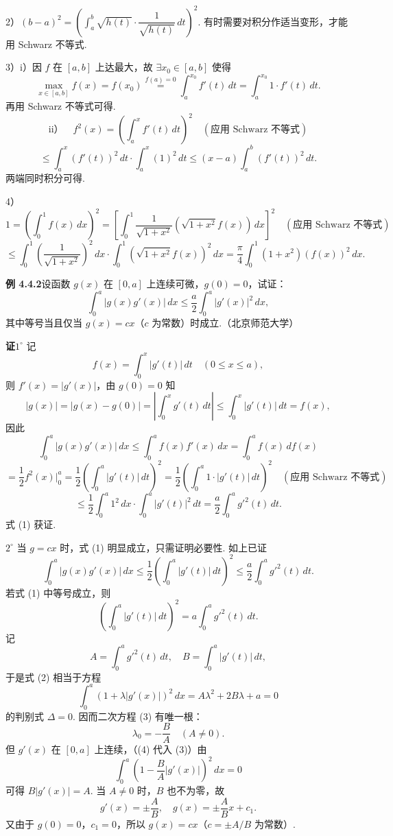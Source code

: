 \documentclass[UTF8,12pt,a4paper,fontset=fandol]{ctexart}
\begin{document}
2）$(b-a)^2=\left(\displaystyle\int_a^b \sqrt{h(t)}\cdot\dfrac1{\sqrt{h(t)}}\,dt\right)^2$. 有时需要对积分作适当变形，才能用 Schwarz 不等式.

3）i）因 $f$ 在 $[a,b]$ 上达最大，故 $\exists x_0\in[a,b]$ 使得
\[
\max_{x\in[a,b]}f(x)=f(x_0)\stackrel{f(a)=0}{=}\int_a^{x_0}f'(t)\,dt=\int_a^{x_0}1\cdot f'(t)\,dt.
\]
再用 Schwarz 不等式可得.
\[
\text{ii）}\quad f^2(x)=\left(\int_a^x f'(t)\,dt\right)^2\quad(\text{应用 Schwarz 不等式})
\]
\[
\le \int_a^x(f'(t))^2\,dt\cdot\int_a^x(1)^2\,dt
\le (x-a)\int_a^b(f'(t))^2\,dt.
\]
两端同时积分可得.

4）
\[
1=\left(\int_0^1 f(x)\,dx\right)^2
=\left[\int_0^1\frac1{\sqrt{1+x^2}}(\sqrt{1+x^2}f(x))\,dx\right]^2\quad(\text{应用 Schwarz 不等式})
\]
\[
\le \int_0^1\left(\frac1{\sqrt{1+x^2}}\right)^2\,dx\cdot
\int_0^1(\sqrt{1+x^2}f(x))^2\,dx
=\frac\pi4\int_0^1(1+x^2)(f(x))^2\,dx.
\]

\noindent\textbf{例 4.4.2}\quad 设函数 $g(x)$ 在 $[0,a]$ 上连续可微，$g(0)=0$，试证：
\[
\int_0^a |g(x)g'(x)|\,dx\le\frac a2\int_0^a |g'(x)|^2\,dx, \tag{1}
\]
其中等号当且仅当 $g(x)=cx$（$c$ 为常数）时成立.（北京师范大学）

\noindent\textbf{证}\quad $1^\circ$ 记
\[
f(x)=\int_0^x |g'(t)|\,dt\quad(0\le x\le a),
\]
则 $f'(x)=|g'(x)|$，由 $g(0)=0$ 知
\[
|g(x)|=|g(x)-g(0)|=\left|\int_0^x g'(t)\,dt\right|
\le \int_0^x |g'(t)|\,dt=f(x),
\]
因此
\[
\int_0^a |g(x)g'(x)|\,dx
\le \int_0^a f(x)f'(x)\,dx
=\int_0^a f(x)\,df(x)
\]
\[
=\frac12 f^2(x)\bigg|_0^a
=\frac12\left(\int_0^a |g'(t)|\,dt\right)^2
=\frac12\left(\int_0^a 1\cdot |g'(t)|\,dt\right)^2
\quad(\text{应用 Schwarz 不等式})
\]
\[
\le \frac12\int_0^a 1^2\,dx\cdot\int_0^a |g'(t)|^2\,dt
=\frac a2\int_0^a g'^2(t)\,dt.
\]
式 (1) 获证.

$2^\circ$ 当 $g=cx$ 时，式 (1) 明显成立，只需证明必要性. 如上已证
\[
\int_0^a |g(x)g'(x)|\,dx
\le \frac12\left(\int_0^a |g'(t)|\,dt\right)^2
\le \frac a2\int_0^a g'^2(t)\,dt.
\]
若式 (1) 中等号成立，则
\[
\left(\int_0^a |g'(t)|\,dt\right)^2=a\int_0^a g'^2(t)\,dt. \tag{2}
\]
记
\[
A=\int_0^a g'^2(t)\,dt,\quad B=\int_0^a |g'(t)|\,dt,
\]
于是式 (2) 相当于方程
\[
\int_0^a (1+\lambda |g'(x)|)^2\,dx=A\lambda^2+2B\lambda+a=0 \tag{3}
\]
的判别式 $\Delta=0$. 因而二次方程 (3) 有唯一根：
\[
\lambda_0=-\frac BA\quad(A\ne0). \tag{4}
\]
但 $g'(x)$ 在 $[0,a]$ 上连续，（(4) 代入 (3)）由
\[
\int_0^a\left(1-\frac BA|g'(x)|\right)^2\,dx=0
\]
可得 $B|g'(x)|=A$.
当 $A\ne0$ 时，$B$ 也不为零，故
\[
g'(x)=\pm\frac AB,\quad g(x)=\pm\frac ABx+c_1.
\]
又由于 $g(0)=0$，$c_1=0$，所以 $g(x)=cx$（$c=\pm A/B$ 为常数）.
\end{document}

